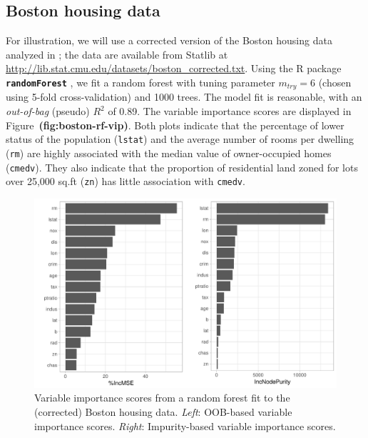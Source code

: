 \documentclass[12pt]{article}
\def\code#1{\texttt{#1}}
\def\pkg#1{\textbf{\texttt{#1}}}
\def\ref#1{\textbf{(#1)}}
\begin{document}
\subsection{Boston housing data}

For illustration, we will use a corrected version of the Boston housing data analyzed in \citet{harrison-1978-hedonic}; the data are available from Statlib at \url{http://lib.stat.cmu.edu/datasets/boston_corrected.txt}. Using the R package \pkg{randomForest} \citep{randomForest-pkg}, we fit a random forest with tuning parameter $m_{try} = 6$ (chosen using 5-fold cross-validation) and 1000 trees. The model fit is reasonable, with an \textit{out-of-bag} (pseudo) $R^2$ of 0.89. The variable importance scores are displayed in Figure~\ref{fig:boston-rf-vip}. Both plots indicate that the percentage of lower status of the population (\code{lstat}) and the average number of rooms per dwelling (\code{rm}) are highly associated with the median value of owner-occupied homes (\code{cmedv}). They also indicate that the proportion of residential land zoned for lots over 25,000 sq.ft (\code{zn}) has little association with \code{cmedv}.
\begin{figure}[!htb]
  \label{boston-rf-vip}
  \centering
  \includegraphics[width=1.0\textwidth]{boston-rf-vip}
  \caption{Variable importance scores from a random forest fit to the (corrected) Boston housing data. \textit{Left}: OOB-based variable importance scores. \textit{Right}: Impurity-based variable importance scores.}
\end{figure}
\end{document}
